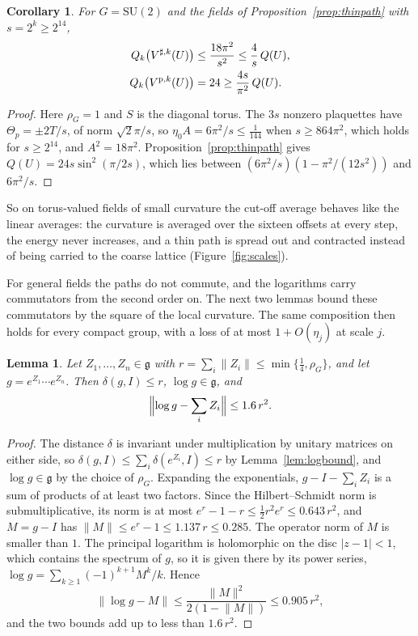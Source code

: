 \documentclass[11pt]{amsart}
\newtheorem{lemma}[theorem]{Lemma}
\newtheorem{corollary}[theorem]{Corollary}
\theoremstyle{definition}
\theoremstyle{remark}
\numberwithin{equation}{section}
\newcommand{\SU}{\mathrm{SU}}
\begin{document}
\begin{corollary}\label{cor:thinscales}
For $G=\SU(2)$ and the fields of Proposition~\ref{prop:thinpath} with
$s=2^k\ge2^{14}$,
\begin{align*}
Q_k\bigl(V^{\sharp,k}(U)\bigr)&\le\frac{18\pi^2}{s^2}\le\frac4s\,Q(U),\\
Q_k\bigl(V^{{\rm p},k}(U)\bigr)&=24\ge\frac{4s}{\pi^2}\,Q(U).
\end{align*}
\end{corollary}

\begin{proof}
Here $\rho_G=1$ and $S$ is the diagonal torus. The $3s$ nonzero plaquettes
have $\Theta_p=\pm2T/s$, of norm $\sqrt2\pi/s$, so $\eta_0A=6\pi^2/s\le
\frac1{144}$ when $s\ge864\pi^2$, which holds for $s\ge2^{14}$, and $A^2=
18\pi^2$. Proposition~\ref{prop:thinpath} gives $Q(U)=24s\sin^2(\pi/2s)$,
which lies between $(6\pi^2/s)(1-\pi^2/(12s^2))$ and $6\pi^2/s$.
\end{proof}

So on torus-valued fields of small curvature the cut-off average behaves
like the linear averages: the curvature is averaged over the sixteen
offsets at every step, the energy never increases, and a thin path is
spread out and contracted instead of being carried to the coarse lattice
(Figure~\ref{fig:scales}).

For general fields the paths do not commute, and the logarithms carry
commutators from the second order on. The next two lemmas bound these
commutators by the square of the local curvature. The same composition
then holds for every compact group, with a loss of at most $1+O(\eta_j)$ at
scale $j$.

\begin{lemma}\label{lem:bch}
Let $Z_1,\dots,Z_n\in\mathfrak g$ with $r=\sum_i\lVert Z_i\rVert\le\min\{
\frac14,\rho_G\}$, and let $g=e^{Z_1}\cdots e^{Z_n}$. Then $\delta(g,I)\le
r$, $\log g\in\mathfrak g$, and
\[
\Bigl\lVert\log g-\sum_iZ_i\Bigr\rVert\le1.6\,r^2 .
\]
\end{lemma}

\begin{proof}
The distance $\delta$ is invariant under multiplication by unitary
matrices on either side, so $\delta(g,I)\le\sum_i\delta(e^{Z_i},I)\le r$ by
Lemma~\ref{lem:logbound}, and $\log g\in\mathfrak g$ by the choice of
$\rho_G$. Expanding the exponentials, $g-I-\sum_iZ_i$ is a sum of products
of at least two factors. Since the Hilbert--Schmidt norm is
submultiplicative, its norm is at most $e^r-1-r\le\frac12r^2e^r\le0.643\,
r^2$, and $M=g-I$ has $\lVert M\rVert\le e^r-1\le1.137\,r\le0.285$. The
operator norm of $M$ is smaller than $1$. The principal logarithm is
holomorphic on the disc $|z-1|<1$, which contains the spectrum of $g$,
so it is given there by its power series, $\log g=\sum_{k\ge1}(-1)^{k+1}
M^k/k$. Hence
\[
\lVert\log g-M\rVert\le\frac{\lVert M\rVert^2}{2(1-\lVert M\rVert)}\le
0.905\,r^2 ,
\]
and the two bounds add up to less than $1.6\,r^2$.
\end{proof}
\end{document}
